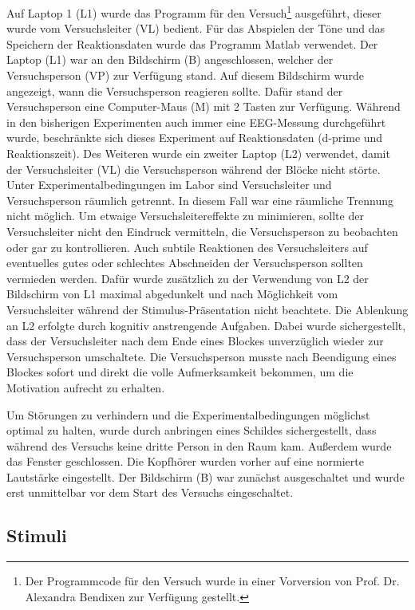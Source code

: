 \documentclass[doc,a4paper,12pt]{apa6}
\begin{document}
Auf Laptop 1 (L1) wurde das Programm für den Versuch\footnote{\label{foot:1}Der Programmcode für den Versuch wurde in einer Vorversion von Prof. Dr. Alexandra Bendixen zur Verfügung gestellt.} ausgeführt, dieser wurde vom Versuchsleiter (VL) bedient. Für das Abspielen der Töne und das Speichern der Reaktionsdaten wurde das Programm Matlab verwendet. Der Laptop (L1) war an den Bildschirm (B) angeschlossen, welcher der Versuchsperson (VP) zur Verfügung stand. Auf diesem Bildschirm wurde angezeigt, wann die Versuchsperson reagieren sollte. Dafür stand der Versuchsperson eine Computer-Maus (M) mit 2 Tasten zur Verfügung. Während in den bisherigen Experimenten auch immer eine EEG-Messung durchgeführt wurde, beschränkte sich dieses Experiment auf Reaktionsdaten (d-prime und Reaktionszeit). Des Weiteren wurde ein zweiter Laptop (L2) verwendet, damit der Versuchsleiter (VL) die Versuchsperson während der Blöcke nicht störte. Unter Experimentalbedingungen im Labor sind Versuchsleiter und Versuchsperson räumlich getrennt. In diesem Fall war eine räumliche Trennung nicht möglich. Um etwaige Versuchsleitereffekte zu minimieren, sollte der Versuchsleiter nicht den Eindruck vermitteln, die Versuchsperson zu beobachten oder gar zu kontrollieren. Auch subtile Reaktionen des Versuchsleiters auf eventuelles gutes oder schlechtes Abschneiden der Versuchsperson sollten vermieden werden. Dafür wurde zusätzlich zu der Verwendung von L2 der Bildschirm von L1 maximal abgedunkelt und nach Möglichkeit vom Versuchsleiter während der Stimulus-Präsentation nicht beachtete. Die Ablenkung an L2 erfolgte durch kognitiv anstrengende Aufgaben. Dabei wurde sichergestellt, dass der Versuchsleiter nach dem Ende eines Blockes unverzüglich wieder zur Versuchsperson umschaltete. Die Versuchsperson musste nach Beendigung eines Blockes sofort und direkt die volle Aufmerksamkeit bekommen, um die Motivation aufrecht zu erhalten.

Um Störungen zu verhindern und die Experimentalbedingungen möglichst optimal zu halten, wurde durch anbringen eines Schildes sichergestellt, dass während des Versuchs keine dritte Person in den Raum kam. Außerdem wurde das Fenster geschlossen. Die Kopfhörer wurden vorher auf eine normierte Lautstärke eingestellt. Der Bildschirm (B) war zunächst ausgeschaltet und wurde erst unmittelbar vor dem Start des Versuchs eingeschaltet.

\subsection{Stimuli}
\end{document}
